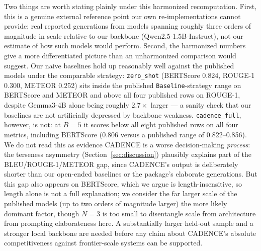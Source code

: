\documentclass[lettersize,journal]{IEEEtran}
\begin{document}
Two things are worth stating plainly under this harmonized recomputation. First, this is a genuine external reference point our own re-implementations cannot provide: real reported generations from models spanning roughly three orders of magnitude in scale relative to our backbone (Qwen2.5-1.5B-Instruct), not our estimate of how such models would perform. Second, the harmonized numbers give a more differentiated picture than an unharmonized comparison would suggest. Our naive baselines hold up reasonably well against the published models under the comparable strategy: \texttt{zero\_shot} (BERTScore 0.824, ROUGE-1 0.300, METEOR 0.252) sits inside the published \texttt{Baseline}-strategy range on BERTScore and METEOR and above all four published rows on ROUGE-1, despite Gemma3-4B alone being roughly $2.7\times$ larger --- a sanity check that our baselines are not artificially depressed by backbone weakness. \texttt{cadence\_full}, however, is not: at $B=5$ it scores below all eight published rows on all four metrics, including BERTScore (0.806 versus a published range of 0.822--0.856). We do not read this as evidence CADENCE is a worse decision-making \emph{process}: the terseness asymmetry (Section~\ref{sec:discussion}) plausibly explains part of the BLEU/ROUGE-1/METEOR gap, since CADENCE's output is deliberately shorter than our open-ended baselines or the package's elaborate generations. But this gap also appears on BERTScore, which we argue is length-insensitive, so length alone is not a full explanation; we consider the far larger scale of the published models (up to two orders of magnitude larger) the more likely dominant factor, though $N=3$ is too small to disentangle scale from architecture from prompting elaborateness here. A substantially larger held-out sample and a stronger local backbone are needed before any claim about CADENCE's absolute competitiveness against frontier-scale systems can be supported.
\end{document}
